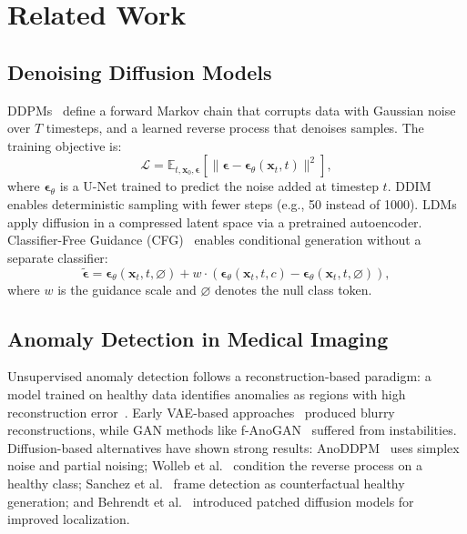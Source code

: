 \documentclass[graybox]{svmult}
\begin{document}
\section{Related Work}
\label{sec:related_work}

\subsection{Denoising Diffusion Models}

DDPMs~\cite{ho2020denoising} define a forward Markov chain that corrupts data with Gaussian noise over $T$ timesteps, and a learned reverse process that denoises samples. The training objective is:
\begin{equation}
\mathcal{L} = \mathbb{E}_{t, \mathbf{x}_0, \boldsymbol{\epsilon}} \left[ \| \boldsymbol{\epsilon} - \boldsymbol{\epsilon}_\theta(\mathbf{x}_t, t) \|^2 \right],
\label{eq:ddpm_loss}
\end{equation}
where $\boldsymbol{\epsilon}_\theta$ is a U-Net trained to predict the noise added at timestep $t$. DDIM~\cite{song2021denoising} enables deterministic sampling with fewer steps (e.g., 50 instead of 1000). LDMs~\cite{rombach2022high} apply diffusion in a compressed latent space via a pretrained autoencoder. Classifier-Free Guidance (CFG)~\cite{ho2022classifier} enables conditional generation without a separate classifier:
\begin{equation}
\tilde{\boldsymbol{\epsilon}} = \boldsymbol{\epsilon}_\theta(\mathbf{x}_t, t, \varnothing) + w \cdot \left( \boldsymbol{\epsilon}_\theta(\mathbf{x}_t, t, c) - \boldsymbol{\epsilon}_\theta(\mathbf{x}_t, t, \varnothing) \right),
\label{eq:cfg}
\end{equation}
where $w$ is the guidance scale and $\varnothing$ denotes the null class token.

\subsection{Anomaly Detection in Medical Imaging}

Unsupervised anomaly detection follows a reconstruction-based paradigm: a model trained on healthy data identifies anomalies as regions with high reconstruction error~\cite{baur2021autoencoders}. Early VAE-based approaches~\cite{kingma2014auto} produced blurry reconstructions, while GAN methods like f-AnoGAN~\cite{schlegl2019f} suffered from instabilities. Diffusion-based alternatives have shown strong results: AnoDDPM~\cite{wyatt2022anoddpm} uses simplex noise and partial noising; Wolleb et al.~\cite{wolleb2022diffusion} condition the reverse process on a healthy class; Sanchez et al.~\cite{sanchez2022healthy} frame detection as counterfactual healthy generation; and Behrendt et al.~\cite{behrendt2024patched} introduced patched diffusion models for improved localization.
\end{document}
